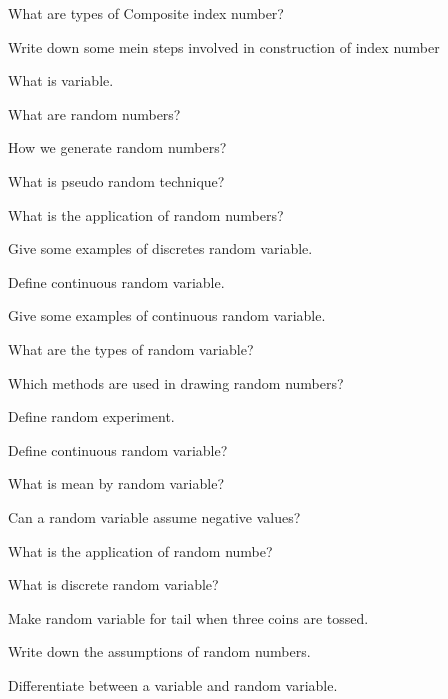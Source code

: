 \documentclass[11pt,a4paper]{article}
\begin{document}
\begin{shortlist}
\item What are types of Composite index number?

\item Write down some mein steps involved in construction of index number

\item What is variable.

\item What are random numbers?

\item How we generate random numbers?

\item What is pseudo random technique?

\item What is the application of random numbers?

\item Give some examples of discretes random variable.

\item Define continuous random variable.

\item Give some examples of continuous random variable.

\item What are the types of random variable?

\item Which methods are used in drawing random numbers?

\item Define random experiment.

\item Define continuous random variable?

\item What is mean by random variable?

\item Can a random variable assume negative values?

\item What is the application of random numbe?

\item What is discrete random variable?

\item Make random variable for tail when three coins are tossed.

\item Write down the assumptions of random numbers.

\item Differentiate between a variable and random variable.


\end{shortlist}
\end{document}
